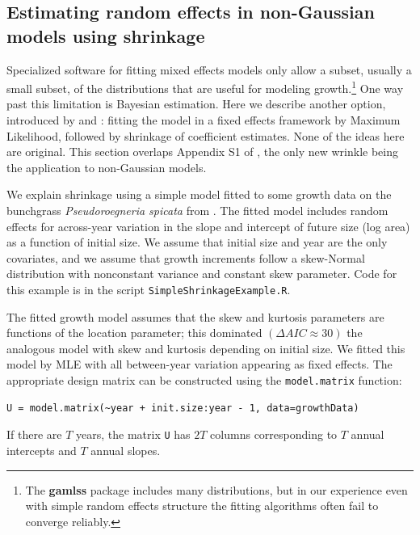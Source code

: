 \documentclass[12pt]{article}
\begin{document}
\begin{spacing}{1.35}
\section{Estimating random effects in non-Gaussian models using shrinkage}
\label{sec:shrinkageFits}
Specialized software for fitting mixed effects models only allow a subset, usually a small subset, of the distributions that 
are useful for modeling growth.\footnote{The \textbf{gamlss} package includes many distributions, but in our experience even with 
simple random effects structure the fitting algorithms often fail to converge reliably.} One way past this limitation is Bayesian estimation. Here we describe another option, 
introduced by \citet{link-nichols-1994} and \citet{gould-nichols-1998}: 
fitting the model in a fixed effects framework by Maximum Likelihood, followed by shrinkage of coefficient estimates. 
None of the ideas here are original. This section overlaps Appendix S1 of \citet{metcalf-etal-2015}, the only new wrinkle
being the application to non-Gaussian models.

We explain shrinkage using a simple model fitted to some growth data 
on the bunchgrass \emph{Pseudoroegneria spicata} from \cite{adler-weak-dryad}. 
The fitted model includes random effects for across-year variation in the slope and 
intercept of future size (log area) as a function of initial size. We assume that initial size 
and year are the only covariates, and we assume that growth increments 
follow a skew-Normal distribution with nonconstant variance and constant skew parameter. 
Code for this example is in the script \texttt{SimpleShrinkageExample.R}. 

The fitted growth model assumes that the skew and kurtosis parameters are functions
of the location parameter; this dominated $(\Delta AIC \approx 30)$ the analogous  
model with skew and kurtosis depending on initial size.   
We fitted this model by MLE with all between-year variation appearing as fixed effects. 
The appropriate design matrix can be constructed using the \texttt{model.matrix} function: 
\begin{lstlisting}
U = model.matrix(~year + init.size:year - 1, data=growthData)
\end{lstlisting}
If there are $T$ years, the matrix \texttt{U} has $2T$ columns corresponding to $T$ annual 
intercepts and $T$ annual slopes. 


\end{spacing}
\end{document}
